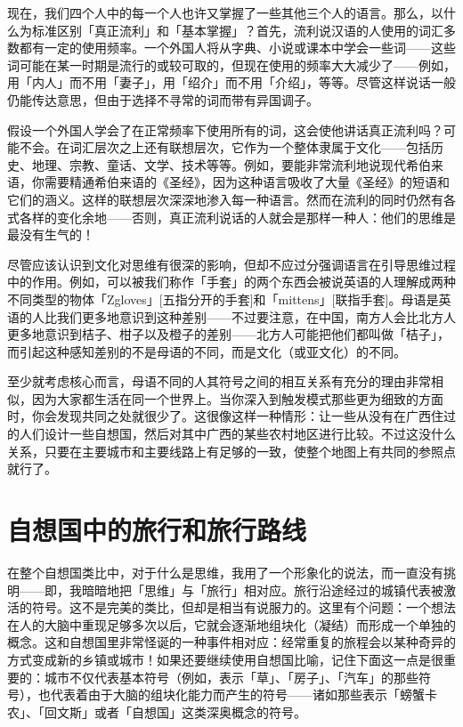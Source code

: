 \documentclass[
  12pt,
  twoside,
  openright,
  oldfontcommands,
]{memoir}
\begin{document}
现在，我们四个人中的每一个人也许又掌握了一些其他三个人的语言。那么，以什么为标准区别「真正流利」和「基本掌握」？首先，流利说汉语的人使用的词汇多数都有一定的使用频率。一个外国人将从字典、小说或课本中学会一些词------这些词可能在某一时期是流行的或较可取的，但现在使用的频率大大减少了------例如，用「内人」而不用「妻子」，用「绍介」而不用「介绍」，等等。尽管这样说话一般仍能传达意思，但由于选择不寻常的词而带有异国调子。

假设一个外国人学会了在正常频率下使用所有的词，这会使他讲话真正流利吗？可能不会。在词汇层次之上还有联想层次，它作为一个整体隶属于文化------包括历史、地理、宗教、童话、文学、技术等等。例如，要能非常流利地说现代希伯来语，你需要精通希伯来语的《圣经》，因为这种语言吸收了大量《圣经》的短语和它们的涵义。这样的联想层次深深地渗入每一种语言。然而在流利的同时仍然有各式各样的变化余地------否则，真正流利说话的人就会是那样一种人：他们的思维是最没有生气的！

尽管应该认识到文化对思维有很深的影响，但却不应过分强调语言在引导思维过程中的作用。例如，可以被我们称作「手套」的两个东西会被说英语的人理解成两种不同类型的物体「Zgloves」{[}五指分开的手套{]}和「mittens」{[}联指手套{]}。母语是英语的人比我们更多地意识到这种差别------不过要注意，在中国，南方人会比北方人更多地意识到桔子、柑子以及橙子的差别------北方人可能把他们都叫做「桔子」，而引起这种感知差别的不是母语的不同，而是文化（或亚文化）的不同。

至少就考虑核心而言，母语不同的人其符号之间的相互关系有充分的理由非常相似，因为大家都生活在同一个世界上。当你深入到触发模式那些更为细致的方面时，你会发现共同之处就很少了。这很像这样一种情形：让一些从没有在广西住过的人们设计一些自想国，然后对其中广西的某些农村地区进行比较。不过这没什么关系，只要在主要城市和主要线路上有足够的一致，使整个地图上有共同的参照点就行了。

\section{自想国中的旅行和旅行路线}

在整个自想国类比中，对于什么是思维，我用了一个形象化的说法，而一直没有挑明------即，我暗暗地把「思维」与「旅行」相对应。旅行沿途经过的城镇代表被激活的符号。这不是完美的类比，但却是相当有说服力的。这里有个问题：一个想法在人的大脑中重现足够多次以后，它就会逐渐地组块化（凝结）而形成一个单独的概念。这和自想国里非常怪诞的一种事件相对应：经常重复的旅程会以某种奇异的方式变成新的乡镇或城市！如果还要继续使用自想国比喻，记住下面这一点是很重要的：城市不仅代表基本符号（例如，表示「草」、「房子」、「汽车」的那些符号），也代表着由于大脑的组块化能力而产生的符号------诸如那些表示「螃蟹卡农」、「回文斯」或者「自想国」这类深奥概念的符号。
\end{document}
